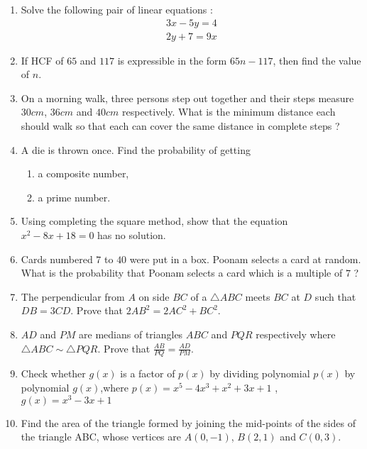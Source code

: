 \documentclass[2pt,-letter paper]{article}
\providecommand{\brak}[1]{\ensuremath{\left(#1\right)}}
\begin{document}
\begin{enumerate}
\item Solve the following pair of linear equations :
\begin{align*}
 3x - 5y = 4\\
2y + 7 = 9x   
\end{align*}    
 
\item If HCF of $65$ and $117$ is expressible in the form $65n - 117$, then find the value of $n$.

\item On a morning walk, three persons step out together and their steps
measure $30 cm$, $36 cm$ and $40 cm$ respectively. What is the minimum
distance each should walk so that each can cover the same distance in
complete steps ?

\item A die is thrown once. Find the probability of getting
\begin{enumerate}
\item a composite number,
\item a prime number.
 \end{enumerate}

\item Using completing the square method, show that the equation
$x^2 - 8x + 18 = 0$ has no solution.

\item Cards numbered $7$ to $40$ were put in a box. Poonam selects a card at
random. What is the probability that Poonam selects a card which is a
multiple of $7$ ?
 

\item The perpendicular from $A$ on side $BC$ of a $\triangle ABC$ meets $BC$ at $D$ such that
$DB = 3CD$. Prove that $2AB^2 = 2AC^2 + BC^2$.

\item $AD$ and $PM$ are medians of triangles $ABC$ and $PQR$ respectively where
$\triangle ABC \sim \triangle PQR$. Prove that ${\frac {AB}{PQ}} = {\frac {AD}{PM}}$.

\item Check whether $g\brak{x}$ is a factor of $p\brak{x}$ by dividing polynomial $p\brak{x}$ by polynomial $g\brak{x}$,where $p\brak{x} = x^5 - 4x^3 + x^2 + 3x + 1$ , $g\brak{x} = x^3 - 3x + 1$

\item Find the area of the triangle formed by joining the mid-points of the sides of the triangle ABC, whose vertices are $A\brak{0, - 1}$, $B\brak{2, 1}$ and $C\brak{0, 3}$.


\end{enumerate}
\end{document}
